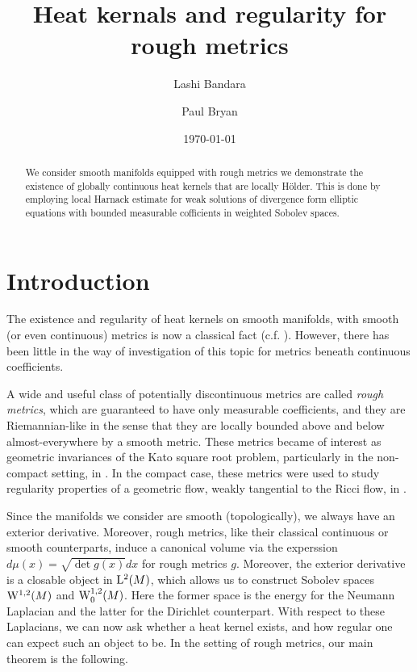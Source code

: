 \documentclass[a4paper, 12pt]{amsart}
\begin{document}
\title{Heat kernals and regularity for rough metrics}

\author{Lashi Bandara}
\author{Paul Bryan}

\curraddr{}
\email{}
\date{\today}

\dedicatory{}
\subjclass[2010]{}
\keywords{}

\parindent0cm
\setlength{\parskip}{\baselineskip}


\begin{abstract}
We consider smooth manifolds equipped with rough metrics
we demonstrate the existence of globally continuous
heat kernels that are locally Hölder. This is done 
by employing local Harnack estimate for weak
solutions of divergence form elliptic equations
with bounded measurable cofficients in weighted Sobolev
spaces.
\end{abstract}

\maketitle

\section{Introduction}
\label{sec:intro}
The existence and regularity of heat kernels on smooth manifolds, with smooth (or even continuous)
metrics is now a classical fact (c.f. \cite{}). However, there has been
little in the way of investigation
of this topic for metrics beneath continuous coefficients. 

A wide and useful class of potentially discontinuous metrics are called \emph{rough metrics}, 
which are guaranteed to have only measurable coefficients, and they are Riemannian-like in the sense
that they are locally bounded above and below almost-everywhere by a smooth metric.
These metrics became of interest as geometric invariances of the Kato square
root problem, particularly in the non-compact setting, in \cite{BMc, BRough}. 
In the compact case, these metrics were used to study regularity properties
of a geometric flow, weakly tangential to the Ricci flow, 
in \cite{BLM, BCont}. 

Since the manifolds we consider are smooth (topologically), we always have an 
exterior derivative. Moreover, rough metrics, like their classical continuous
or smooth counterparts, induce a canonical volume via the 
experssion $d\mu(x) = \sqrt{\det g(x)} dx$ for rough metrics $g$.
Moreover, the exterior derivative is a closable object
in $\Lp{2}(M)$, which allows us to construct Sobolev spaces $\SobH{1}(M)$ 
and $\SobH[0]{1}(M)$. Here the  
former space is the  energy for the Neumann Laplacian
and the latter for the Dirichlet counterpart.
With respect to these Laplacians, we can now ask
whether a heat kernel exists, and how regular one
can expect such an object to be. In the setting of rough metrics, our main theorem
is the following. 
\end{document}
